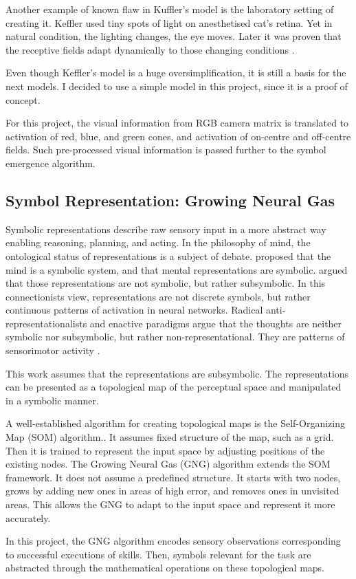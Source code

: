 Another example of known flaw in Kuffler’s model is the laboratory setting of creating it. Keffler used tiny spots of light on anesthetised cat’s retina. Yet in natural condition, the lighting changes, the eye moves. Later it was proven that the receptive fields adapt dynamically to those changing conditions \parencite{smirnakis1997adaptation}.

Even though Keffler's model is a huge oversimplification, it is still a basis for the next models. I decided to use a simple model in this project, since it is a proof of concept.

For this project, the visual information from RGB camera matrix is translated to activation of red, blue, and green cones, and activation of on-centre and off-centre fields. Such pre-processed visual information is passed further to the symbol emergence algorithm. 

\subsection{Symbol Representation: Growing Neural Gas} \label{chapter:theory:GNG}
Symbolic representations describe raw sensory input in a more abstract way enabling reasoning, planning, and acting. In the philosophy of mind, the ontological status of representations is a subject of debate. \textcite{fodor1975language} proposed that the mind is a symbolic system, and that mental representations are symbolic. \textcite{smolensky1988proper} argued that those representations are not symbolic, but rather subsymbolic. In this connectionists view, representations are not discrete symbols, but rather continuous patterns of activation in neural networks. Radical anti-representationalists and enactive paradigms argue that the thoughts are neither symbolic nor subsymbolic, but rather non-representational. They are patterns of sensorimotor activity \parencite{brooks1991intelligence}. 

This work assumes that the representations are subsymbolic. The representations can be presented as a topological map of the perceptual space and manipulated in a symbolic manner.

A well-established algorithm for creating topological maps is the Self-Organizing Map (SOM) algorithm.\parencite{ritter1989som, kohonen1982self}. It assumes fixed structure of the map, such as a grid. Then it is trained to represent the input space by adjusting positions of the existing nodes. The Growing Neural Gas (GNG) algorithm \parencite{fritzke1994gng} extends the SOM framework. It does not assume a predefined structure. It starts with two nodes, grows by adding new ones in areas of high error, and removes ones in unvisited areas. This allows the GNG to adapt to the input space and represent it more accurately.

In this project, the GNG algorithm encodes sensory observations corresponding to successful executions of skills. Then, symbols relevant for the task are abstracted through the mathematical operations on these topological maps.
